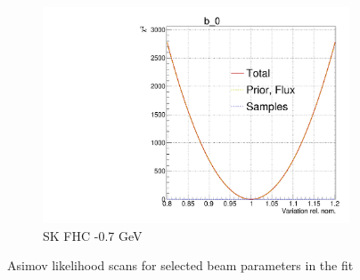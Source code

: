 \begin{figure}[!h]
\begin{subfigure}[t]{0.32\textwidth}
	\includegraphics[width=\textwidth, trim={0mm 0mm 0mm 11mm}, clip,page=55]{figures/mach3/Asimov/Full_LLHscan_18July_BeRPA_U_ND280logL_scan}
	\caption{SK FHC -0.7 GeV}
\end{subfigure}
\caption{Asimov likelihood scans for selected beam parameters in the fit}
\label{fig:beam_asimov}
\end{figure}

